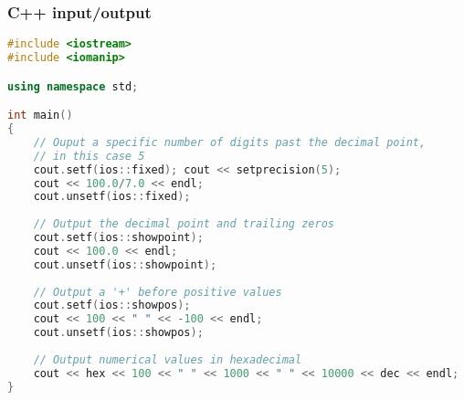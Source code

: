 \subsubsection{C++ input/output}
\begin{lstlisting}[language=C++]
#include <iostream>
#include <iomanip>

using namespace std;

int main()
{
    // Ouput a specific number of digits past the decimal point,
    // in this case 5    
    cout.setf(ios::fixed); cout << setprecision(5);
    cout << 100.0/7.0 << endl;
    cout.unsetf(ios::fixed);
    
    // Output the decimal point and trailing zeros
    cout.setf(ios::showpoint);
    cout << 100.0 << endl;
    cout.unsetf(ios::showpoint);
    
    // Output a '+' before positive values
    cout.setf(ios::showpos);
    cout << 100 << " " << -100 << endl;
    cout.unsetf(ios::showpos);
    
    // Output numerical values in hexadecimal
    cout << hex << 100 << " " << 1000 << " " << 10000 << dec << endl;
}

\end{lstlisting}
